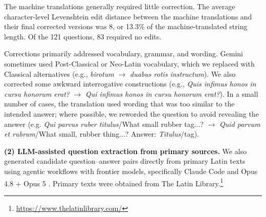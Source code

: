 \documentclass[11pt]{article}
\newcommand{\mhcomment}[1]{\textcolor{blue}{\bf \small [ #1 --MH]}}
\begin{document}
The machine translations generally required little correction. The average character-level Levenshtein edit distance \cite{wagner1974string} between the machine translations and their final corrected versions was 8, or 13.3\% of the machine-translated string length. Of the 121 questions, 83 required no edits.

Corrections primarily addressed vocabulary, grammar, and wording. Gemini sometimes used Post-Classical or Neo-Latin vocabulary, which we replaced with Classical alternatives (e.g., \textit{birotum} $\rightarrow$ \textit{duabus rotis instructum}). We also corrected some awkward interrogative constructions (e.g., \textit{Quis infimus honos in cursu honorum erat?} $\rightarrow$ \textit{Qui infimus honos in cursu honorum erat?}). In a small number of cases, the translation used wording that was too similar to the intended answer; where possible, we reworded the question to avoid revealing the answer (e.g. \textit{Qui parvus ruber titulus}/What small rubber tag...? $\rightarrow$ \textit{Quid parvum et rubrum}/What small, rubber thing...?  Answer: \textit{Titulus}/tag).




\textbf{(2) LLM-assisted question extraction from primary sources.}
We also generated candidate question--answer pairs directly from primary Latin texts using agentic workflows with frontier models, specifically Claude Code and Opus 4.8 + Opus 5 \cite{anthropic2026opus48, anthropic2026opus5}. Primary texts were obtained from The Latin Library.\footnote{\url{https://www.thelatinlibrary.com/}}
\end{document}
